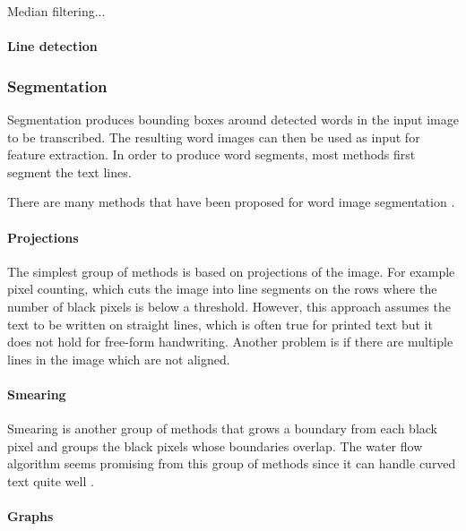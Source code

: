 Median filtering...

\paragraph{Line detection}


\subsubsection{Segmentation}

Segmentation produces bounding boxes around detected words in the input image to be transcribed. The resulting word images can then be used as input for feature extraction. In order to produce word segments, most methods first segment the text lines.

There are many methods that have been proposed for word image segmentation \cite{HWR_survey, Waterflow2011, Waterflow2015}.

\paragraph{Projections}

The simplest group of methods is based on projections of the image. For example pixel counting, which cuts the image into line segments on the rows where the number of black pixels is below a threshold. However, this approach assumes the text to be written on straight lines, which is often true for printed text but it does not hold for free-form handwriting. Another problem is if there are multiple lines in the image which are not aligned.

\paragraph{Smearing}

Smearing is another group of methods that grows a boundary from each black pixel and groups the black pixels whose boundaries overlap. The water flow algorithm seems promising from this group of methods since it can handle curved text quite well \cite{Waterflow2011, Waterflow2015}.

\paragraph{Graphs}

